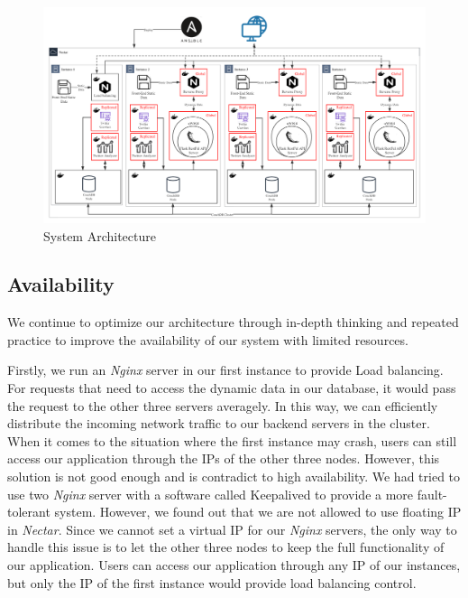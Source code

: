 \documentclass{article}
\begin{document}
\begin{figure}[htp]
\centering
\includegraphics[width=\textwidth]{img/architecture.png}
\caption{System Architecture}
\label{fig:systemArchitecture}
\end{figure}

\subsection{Availability}
We continue to optimize our architecture through in-depth thinking and repeated practice to improve the availability of our system with limited resources.

Firstly, we run an \textit{Nginx} server in our first instance to provide Load balancing. For requests that need to access the dynamic data in our database, it would pass the request to the other three servers averagely. In this way, we can efficiently distribute the incoming network traffic to our backend servers in the cluster. When it comes to the situation where the first instance may crash, users can still access our application through the IPs of the other three nodes. However, this solution is not good enough and is contradict to high availability. We had tried to use two \textit{Nginx} server with a software called Keepalived to provide a more fault-tolerant system. However, we found out that we are not allowed to use floating IP in \textit{Nectar}. Since we cannot set a virtual IP for our \textit{Nginx} servers, the only way to handle this issue is to let the other three nodes to keep the full functionality of our application. Users can access our application through any IP of our instances, but only the IP of the first instance would provide load balancing control. 
\end{document}
